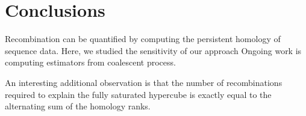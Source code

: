 
\section{Conclusions}
\label{sec:conclusion}
%
Recombination can be quantified by computing the persistent homology of sequence data.
Here, we studied the sensitivity of our approach
Ongoing work is computing estimators from coalescent process.

An interesting additional observation is that the number of recombinations required to explain the fully saturated hypercube is exactly equal to the alternating sum of the homology ranks.